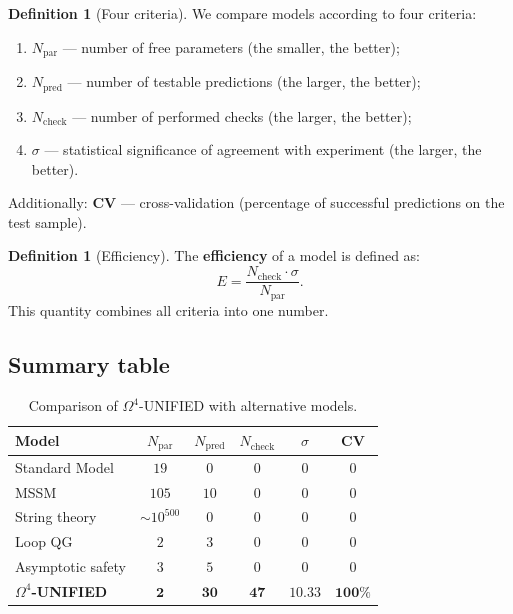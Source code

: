\documentclass[11pt,a4paper]{article}
\newcommand{\Om}{\Omega^4}
\theoremstyle{definition}
\newtheorem{definition}[theorem]{Definition}
\begin{document}
\begin{definition}[Four criteria]
\label{def:four-criteria}
We compare models according to four criteria:
\begin{enumerate}
    \item \textbf{$N_{\text{par}}$} — number of free parameters 
          (the smaller, the better);
    \item \textbf{$N_{\text{pred}}$} — number of testable 
          predictions (the larger, the better);
    \item \textbf{$N_{\text{check}}$} — number of performed 
          checks (the larger, the better);
    \item \textbf{$\sigma$} — statistical significance 
          of agreement with experiment (the larger, the better).
\end{enumerate}
Additionally: \textbf{CV} — cross-validation (percentage 
of successful predictions on the test sample).
\end{definition}

\begin{definition}[Efficiency]
\label{def:efficiency}
The \textbf{efficiency} of a model is defined as:
\begin{equation}
    \boxed{
    E = \frac{N_{\text{check}} \cdot \sigma}{N_{\text{par}}}.
    }
    \label{eq:efficiency}
\end{equation}
This quantity combines all criteria into one number.
\end{definition}

\subsection{Summary table}
\label{subsec:benchmark-table}

\begin{table}[htbp]
\centering
\caption{Comparison of $\Om$-UNIFIED with alternative models.}
\label{tab:benchmark}
\begin{tabular}{lccccc}
\toprule
Model & $N_{\text{par}}$ & $N_{\text{pred}}$ & $N_{\text{check}}$ 
& $\sigma$ & CV \\
\midrule
Standard Model & $19$ & $0$ & $0$ & $0$ & $0$ \\
MSSM & $105$ & $10$ & $0$ & $0$ & $0$ \\
String theory & $\sim 10^{500}$ & $0$ & $0$ & $0$ & $0$ \\
Loop QG & $2$ & $3$ & $0$ & $0$ & $0$ \\
Asymptotic safety & $3$ & $5$ & $0$ & $0$ & $0$ \\
\midrule
\textbf{$\Om$-UNIFIED} & $\mathbf{2}$ & $\mathbf{30}$ & $\mathbf{47}$ 
& $\mathbf{10.33}$ & $\mathbf{100\%}$ \\
\bottomrule
\end{tabular}
\end{table}
\end{document}
